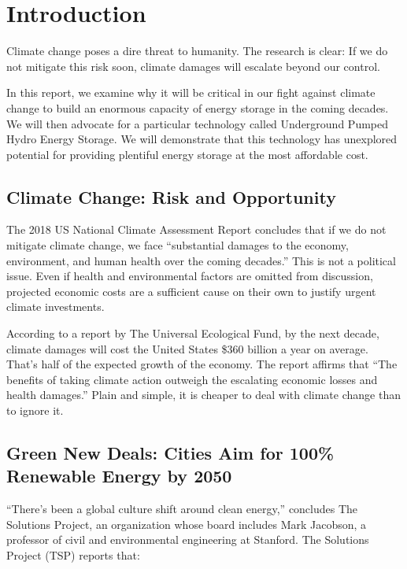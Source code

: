 \documentclass[hidelinks,12pt,a4paper]{article}
\begin{document}
\pagebreak
\renewcommand{\baselinestretch}{0.75}\normalsize
{\footnotesize
  \tableofcontents
}
\renewcommand{\baselinestretch}{1.5}\normalsize

\pagebreak[4]
\section{Introduction}
Climate change poses a dire threat to humanity. The research is clear: If we do not mitigate this risk soon, climate damages will escalate beyond our control.

In this report, we examine why it will be critical in our fight against climate change to build an enormous capacity of energy storage in the coming decades. We will then advocate for a particular technology called Underground Pumped Hydro Energy Storage. We will demonstrate that this technology has unexplored potential for providing plentiful energy storage at the most affordable cost.

\subsection{Climate Change: Risk and Opportunity}
The 2018 US National Climate Assessment Report concludes that if we do not mitigate climate change, we face “substantial damages to the economy, environment, and human health over the coming decades.” \cite{NationalClimateAssessmentReport} This is not a political issue. Even if health and environmental factors are omitted from discussion, projected economic costs are a sufficient cause on their own to justify urgent climate investments.

According to a report by The Universal Ecological Fund, by the next decade, climate damages will cost the United States \$360 billion a year on average. That's half of the expected growth of the economy. \cite{TheEconomicCaseForClimateActionInTheUnitedStates} The report affirms that “The benefits of taking climate action outweigh the escalating economic losses and health damages.” \cite{TheEconomicCaseForClimateActionInTheUnitedStates} Plain and simple, it is cheaper to deal with climate change than to ignore it.

\subsection{Green New Deals: Cities Aim for 100\% Renewable Energy by 2050}
“There’s been a global culture shift around clean energy,” \cite{TheSolutionsProject2018ImpactReport} concludes The Solutions Project, an organization whose board includes Mark Jacobson, a professor of civil and environmental engineering at Stanford. The Solutions Project (TSP) reports that: \cite{TheSolutionsProject2018ImpactReport}
\end{document}
